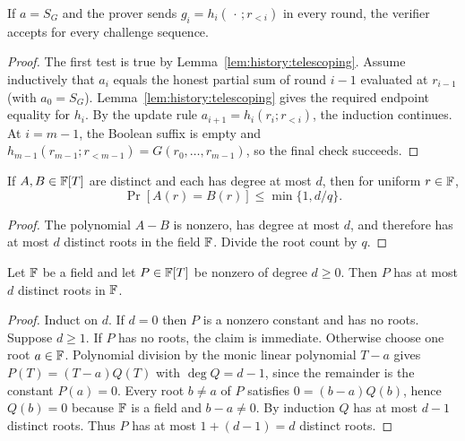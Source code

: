 \begin{lemma}[Completeness]\label{lem:history:sumcheck-complete}
If $a=S_G$ and the prover sends
$g_i=h_i(\,\cdot\,;r_{<i})$ in every round, the verifier accepts for every challenge sequence.
\end{lemma}
\begin{proof}
The first test is true by Lemma~\ref{lem:history:telescoping}.
Assume inductively that $a_i$ equals the honest partial sum of round $i-1$ evaluated at $r_{i-1}$ (with $a_0=S_G$).
Lemma~\ref{lem:history:telescoping} gives the required endpoint equality for $h_i$.
By the update rule $a_{i+1}=h_i(r_i;r_{<i})$, the induction continues.
At $i=m-1$, the Boolean suffix is empty and $h_{m-1}(r_{m-1};r_{<m-1})=G(r_0,\ldots,r_{m-1})$, so the final check succeeds.
\end{proof}

\begin{lemma}\label{lem:history:roots}
If $A,B\in\mathbb{F}[T]$ are distinct and each has degree at most $d$, then for uniform $r\in\mathbb{F}$,
\[
  \Pr[A(r)=B(r)]\leq \min\{1,d/q\}.
\]
\end{lemma}
\begin{proof}
The polynomial $A-B$ is nonzero, has degree at most $d$, and therefore has at most $d$ distinct roots in the field $\mathbb{F}$. Divide the root count by $q$.
\end{proof}

\begin{lemma}\label{lem:history:rootcount}
Let $\mathbb{F}$ be a field and let $P\in\mathbb{F}[T]$ be nonzero of degree $d\geq0$. Then $P$ has at most $d$ distinct roots in $\mathbb{F}$.
\end{lemma}
\begin{proof}
Induct on $d$. If $d=0$ then $P$ is a nonzero constant and has no roots. Suppose $d\geq1$. If $P$ has no roots, the claim is immediate. Otherwise choose one root $a\in\mathbb{F}$. Polynomial division by the monic linear polynomial $T-a$ gives $P(T)=(T-a)Q(T)$ with $\deg Q=d-1$, since the remainder is the constant $P(a)=0$. Every root $b\neq a$ of $P$ satisfies $0=(b-a)Q(b)$, hence $Q(b)=0$ because $\mathbb{F}$ is a field and $b-a\neq0$. By induction $Q$ has at most $d-1$ distinct roots. Thus $P$ has at most $1+(d-1)=d$ distinct roots.
\end{proof}

